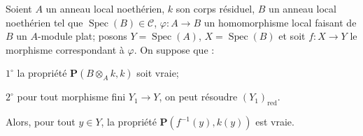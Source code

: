 \begin{proposition}[7.9.8]
\label{IV.2.s7.9.8-fr}
Soient $A$ un anneau local noethérien, $k$ son corps résiduel, $B$ un anneau
local noethérien tel que $\operatorname{Spec}(B)\in\mathcal C$,
$\varphi:A\to B$ un homomorphisme local faisant de $B$ un $A$-module plat;
posons $Y=\operatorname{Spec}(A)$, $X=\operatorname{Spec}(B)$ et soit
$f:X\to Y$ le morphisme correspondant à $\varphi$. On suppose que :

$1^\circ$ la propriété $\boldsymbol P(B\otimes_A k,k)$ soit vraie;

$2^\circ$ pour tout morphisme fini $Y_1\to Y$, on peut résoudre
$(Y_1)_{\mathrm{red}}$.

Alors, pour tout $y\in Y$, la propriété
$\boldsymbol P(f^{-1}(y),k(y))$ est vraie.
\end{proposition}

